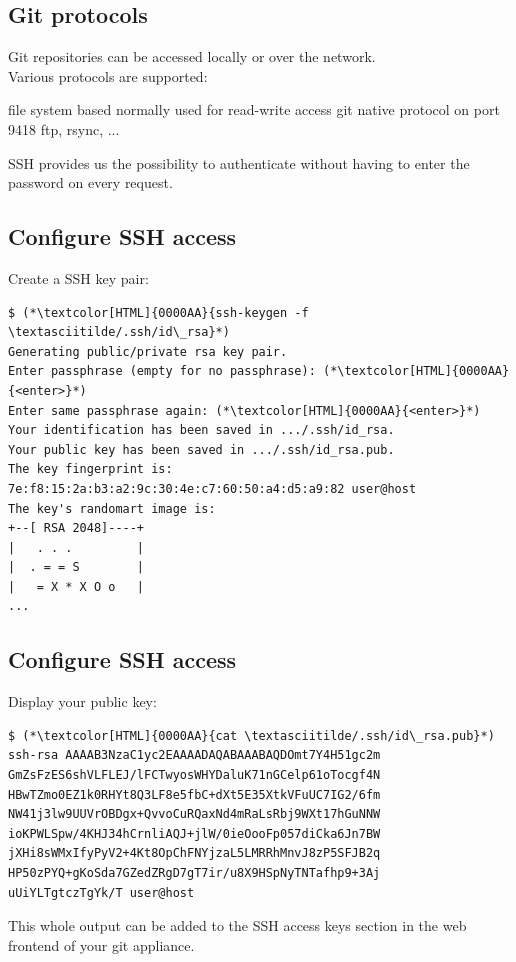 \subsection{Git protocols}
\begin{frame}[fragile]
  \subslidetitle
  Git repositories can be accessed locally or over the network.
  \\
  \vspace{1em}
  Various protocols are supported:
  \begin{itemize}
    {file system based}
      {normally used for read-write access}
      {git native protocol on port 9418}
   {ftp, rsync, ...}
  \end{itemize}
  \vspace{1em}

  SSH provides us the possibility to authenticate without having to enter the password on every request.
\end{frame}

\subsection{Configure SSH access}
\begin{frame}[fragile]
  \subslidetitle
  Create a SSH key pair:
  \begin{lstlisting}
$ (*\textcolor[HTML]{0000AA}{ssh-keygen -f \textasciitilde/.ssh/id\_rsa}*)
Generating public/private rsa key pair.
Enter passphrase (empty for no passphrase): (*\textcolor[HTML]{0000AA}{<enter>}*)
Enter same passphrase again: (*\textcolor[HTML]{0000AA}{<enter>}*)
Your identification has been saved in .../.ssh/id_rsa.
Your public key has been saved in .../.ssh/id_rsa.pub.
The key fingerprint is:
7e:f8:15:2a:b3:a2:9c:30:4e:c7:60:50:a4:d5:a9:82 user@host
The key's randomart image is:
+--[ RSA 2048]----+
|   . . .         |
|  . = = S        |
|   = X * X O o   |
...
\end{lstlisting}
\end{frame}

\subsection{Configure SSH access}
\begin{frame}[fragile]
  \subslidetitle
  Display your public key:
  \begin{lstlisting}
$ (*\textcolor[HTML]{0000AA}{cat \textasciitilde/.ssh/id\_rsa.pub}*)
ssh-rsa AAAAB3NzaC1yc2EAAAADAQABAAABAQDOmt7Y4H51gc2m
GmZsFzES6shVLFLEJ/lFCTwyosWHYDaluK71nGCelp61oTocgf4N
HBwTZmo0EZ1k0RHYt8Q3LF8e5fbC+dXt5E35XtkVFuUC7IG2/6fm
NW41j3lw9UUVrOBDgx+QvvoCuRQaxNd4mRaLsRbj9WXt17hGuNNW
ioKPWLSpw/4KHJ34hCrnliAQJ+jlW/0ieOooFp057diCka6Jn7BW
jXHi8sWMxIfyPyV2+4Kt8OpChFNYjzaL5LMRRhMnvJ8zP5SFJB2q
HP50zPYQ+gKoSda7GZedZRgD7gT7ir/u8X9HSpNyTNTafhp9+3Aj
uUiYLTgtczTgYk/T user@host
\end{lstlisting}

  This whole output can be added to the SSH access keys
  section in the web frontend of your git appliance.
\end{frame}

